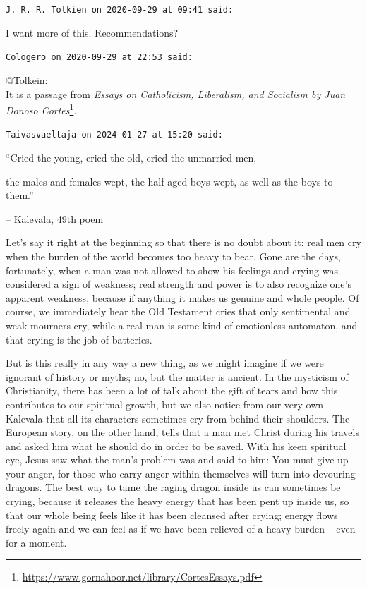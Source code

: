 \begin{footnotesize}
\begin{sffamily}
\texttt{J. R. R. Tolkien on 2020-09-29 at 09:41 said:}

I want more of this. Recommendations?

\hfill

\texttt{Cologero on 2020-09-29 at 22:53 said:}

@Tolkein:\\ It is a passage from \textit{Essays on Catholicism, Liberalism, and Socialism by Juan Donoso Cortes}\footnote{\url{https://www.gornahoor.net/library/CortesEssays.pdf}}.

\hfill

\texttt{Taivasvaeltaja on 2024-01-27 at 15:20 said:}

``Cried the young, cried the old, cried the unmarried men,

the males and females wept, the half-aged boys wept, as well as the boys to them.''

-- Kalevala, 49th poem

Let's say it right at the beginning so that there is no doubt about it: real men cry when the burden of the world becomes too heavy to bear. Gone are the days, fortunately, when a man was not allowed to show his feelings and crying was considered a sign of weakness; real strength and power is to also recognize one's apparent weakness, because if anything it makes us genuine and whole people. Of course, we immediately hear the Old Testament cries that only sentimental and weak mourners cry, while a real man is some kind of emotionless automaton, and that crying is the job of batteries.

But is this really in any way a new thing, as we might imagine if we were ignorant of history or myths; no, but the matter is ancient. In the mysticism of Christianity, there has been a lot of talk about the gift of tears and how this contributes to our spiritual growth, but we also notice from our very own Kalevala that all its characters sometimes cry from behind their shoulders. The European story, on the other hand, tells that a man met Christ during his travels and asked him what he should do in order to be saved. With his keen spiritual eye, Jesus saw what the man's problem was and said to him: You must give up your anger, for those who carry anger within themselves will turn into devouring dragons. The best way to tame the raging dragon inside us can sometimes be crying, because it releases the heavy energy that has been pent up inside us, so that our whole being feels like it has been cleansed after crying; energy flows freely again and we can feel as if we have been relieved of a heavy burden -- even for a moment.


\end{sffamily}
\end{footnotesize}
